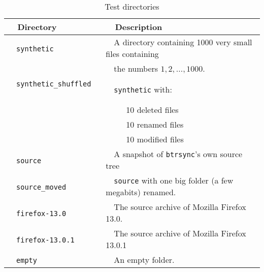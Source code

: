 \documentclass[11pt]{llncs}
\newcommand{\btrsync}{\texttt{btrsync}\xspace}
\begin{document}
%

\begin{table}
\begin{center}
\begin{tabular}{ll}\toprule
~~{\bf Directory}              ~~&~~{\bf Description}\\\midrule
~~{\tt synthetic}              ~~&~~A directory containing 1000 very small files containing~~\\
~~                             ~~&~~the numbers $1,2,\ldots,1000$. \\
~~{\tt synthetic\_shuffled}    ~~&~~{\tt synthetic} with:\\
                             ~~& ~~~~~10 deleted files\\
                             ~~& ~~~~~10 renamed files \\
                             ~~& ~~~~~10 modified files \\
~~{\tt source}                 ~~& ~~A snapshot of \btrsync's own source tree \\
~~{\tt source\_moved}          ~~& ~~{\tt source} with one big folder (a few megabits) renamed.~~\\
~~{\tt firefox-13.0}           ~~& ~~The source archive of Mozilla Firefox 13.0.\\
~~{\tt firefox-13.0.1}         ~~& ~~The source archive of Mozilla Firefox 13.0.1\\
~~{\tt empty}                  ~~& ~~An empty folder.\\\bottomrule
\end{tabular}\smallskip
  \caption{Test directories}
  \label{tab:benchdirec}
\end{center}
\end{table}
\end{document}
